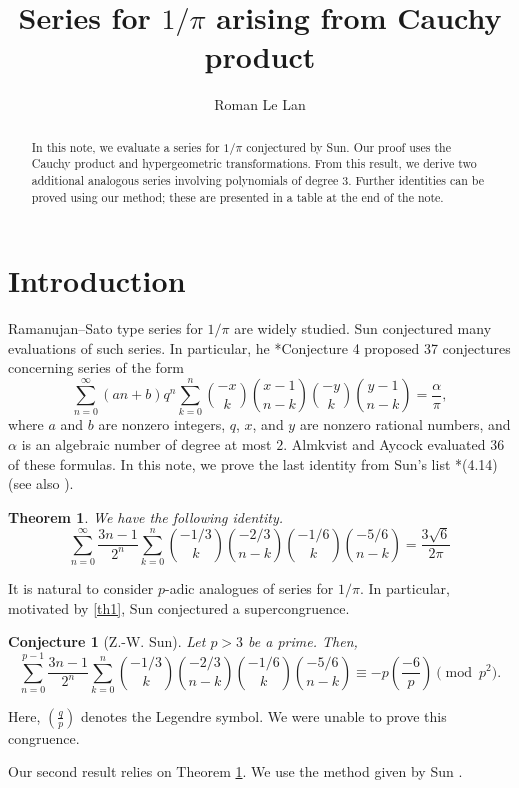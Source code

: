 \documentclass{amsart}
\title{Series for $1/\pi$ arising from Cauchy product}
\author{Roman Le Lan}
\numberwithin{equation}{section}
\newtheorem{theorem}{Theorem}
\newtheorem{conj}{Conjecture}
\def\legendre#1#2{\genfrac(){0.2pt}0{#1}{#2}}
\newcommand{\minilegendre}[2]{\genfrac{(}{)}{}{}{#1}{#2}}
\begin{document}
\begin{abstract}
   In this note, we evaluate a series for $1/\pi$ conjectured by Sun. Our proof uses the Cauchy product and hypergeometric transformations. From this result, we derive two additional analogous series involving polynomials of degree $3$. Further identities can be proved using our method; these are presented in a table at the end of the note.
\end{abstract}
\maketitle

\section{Introduction}
Ramanujan--Sato type series for $1/\pi$ are widely studied. Sun conjectured many evaluations of such series. In particular, he \cite{cong-pi-sun}*{Conjecture 4} proposed 37 conjectures concerning series of the form
\[
\sum_{n=0}^\infty (an+b)q^n\sum_{k=0}^n\binom{-x}{k}\binom{x-1}{n-k}\binom{-y}{k}\binom{y-1}{n-k}=\frac{\alpha}{\pi},
\]
where $a$ and $b$ are nonzero integers, $q$, $x$, and $y$ are nonzero rational numbers, and $\alpha$ is an algebraic number of degree at most $2$. Almkvist and Aycock \cite{aa} evaluated 36 of these formulas. In this note, we prove the last identity from Sun's list \cite{cong-pi-sun}*{(4.14)} (see also \cite{sunconjres}).
\begin{theorem}
We have the following identity.
    \begin{equation}
    \sum_{n=0}^\infty \frac{3n-1}{2^n}\sum_{k=0}^n\binom{-1/3}{k}\binom{-2/3}{n-k}\binom{-1/6}{k}\binom{-5/6}{n-k}=\frac{3\sqrt6}{2\pi}
    \label{th1}
    \end{equation}
    \label{1}
\end{theorem}
It is natural to consider $p$-adic analogues of series for $1/\pi$. In particular, motivated by \eqref{th1}, Sun \cite{sunconjres} conjectured a supercongruence.
\begin{conj}[Z.-W. Sun]
    Let $p>3$ be a prime. Then,
    \[\sum_{n=0}^{p-1} \frac{3n-1}{2^n}\sum_{k=0}^n\binom{-1/3}{k}\binom{-2/3}{n-k}\binom{-1/6}{k}\binom{-5/6}{n-k}\equiv-p\legendre{-6}{p}\pmod{p^2}.\]
\end{conj}
Here, $\minilegendre{q}{p}$ denotes the Legendre symbol. We were unable to prove this congruence. 

Our second result relies on Theorem \ref{1}. We use the method given by Sun \cite{newtypeserie}.
\end{document}
